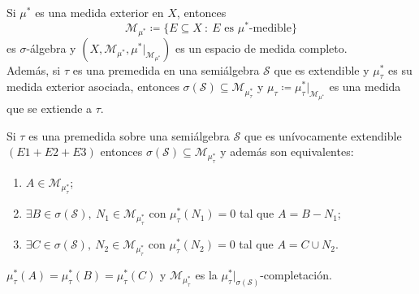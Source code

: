 \begin{corollary}
	Si $\mu^{*}$ es una medida exterior en $X$, entonces
	\[ \mathscr{M}_{\mu^{*}} \coloneq \{E \subseteq X \ : \ E \text{ es } \mu^{*} \text{-medible}\} \]
	es $\sigma$-álgebra y $(X, \mathscr{M}_{\mu^{*}}, \mu^{*}\big|_{\mathscr{M}_{\mu^*}})$ es un espacio de medida completo. \\
	\indent Además, si $\tau$ es una premedida en una semiálgebra $\mathscr{S}$ que es extendible y $\mu^{*}_{\tau}$ es su medida exterior asociada, entonces $\sigma(\mathscr{S}) \subseteq \mathscr{M}_{\mu^{*}_{\tau}}$ y $\mu_{\tau} \coloneq \mu^{*}_{\tau}\big|_{\mathscr{M}_{\mu^{*}}}$ es una medida que se extiende a $\tau$.
\end{corollary}

\begin{theorem}
	Si $\tau$ es una premedida sobre una semiálgebra $\mathscr{S}$ que es unívocamente extendible $(E1 + E2 + E3)$ entonces $\sigma(\mathscr{S}) \subseteq \mathscr{M}_{\mu^{*}_{\tau}}$ y además son equivalentes:
	\begin{enumerate}
		\item $A \in \mathscr{M}_{\mu^{*}_{\tau}}$;

		\item $\exists B \in \sigma(\mathscr{S}),\ N_1 \in \mathscr{M}_{\mu^{*}_{\tau}}$ con $\mu^{*}_{\tau}(N_1) = 0$ tal que $A = B - N_{1}$;

		\item $\exists C \in \sigma(\mathscr{S}),\ N_{2} \in \mathscr{M}_{\mu^{*}_{\tau}}$ con $\mu^{*}_{\tau}(N_{2}) = 0$ tal que $A = C \cup N_{2}$.
	\end{enumerate}
\end{theorem}
\medskip
\begin{remark}
	$\mu^{*}_{\tau}(A) = \mu^{*}_{\tau}(B) = \mu^{*}_{\tau}(C)$ y $\mathscr{M}_{\mu^{*}_{\tau}}$ es la $\mu^{*}_{\tau}\big|_{\sigma(\mathscr{S})}$-completación.
\end{remark}

